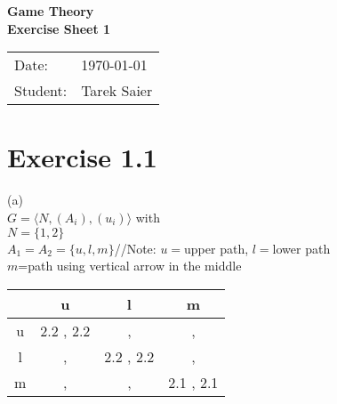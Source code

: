 \documentclass[11pt,a4paper]{article}
\newcommand{\sheetNr}{1}
\begin{document}
\begin{center}
\Huge{\textbf{Game Theory}}\\
\LARGE{\textbf{Exercise Sheet \sheetNr}}
\end{center}
\vspace{2cm}
\begin{tabular}{ll}
Date: & \today\\
Student: & Tarek Saier
\end{tabular}

\section*{Exercise 1.1}
(a)\\
$G=\langle N, (A_i), (u_i)\rangle$ with\\
$N=\{1,2\}$\\
$A_1=A_2=\{u,l,m\}$\hphantom{tabtab}//Note: $u=$upper path, $l=$lower path\\
\hphantom{tabtabtabtabtabtabtabtabtabtabta}$m$=path using vertical arrow in the middle\\

\begin{tabular}{c|c|c|c|}
  & u & l & m\\
\hline
u & 2.2 , 2.2 & , & ,\\
\hline
l & , & 2.2 , 2.2 & ,\\
\hline
m & , & , & 2.1 , 2.1\\
\hline
\end{tabular}\\

\label{lastpage}
\end{document}
